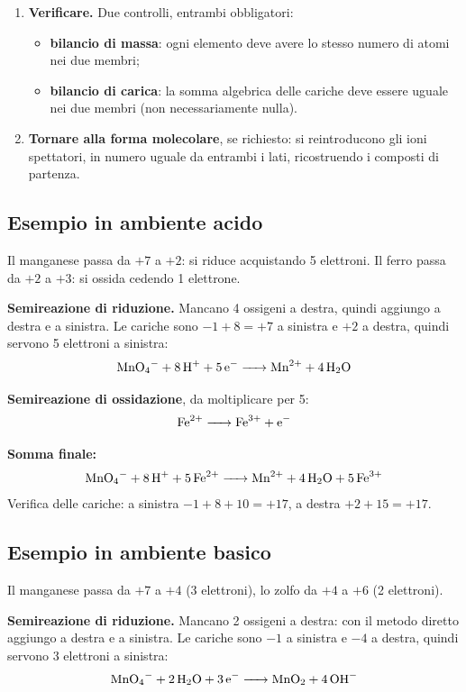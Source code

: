 \documentclass[11pt, a4paper, openright]{book}
\begin{document}
\begin{enumerate}
    \item \textbf{Verificare.} Due controlli, entrambi obbligatori:
    \begin{itemize}
        \item \textbf{bilancio di massa}: ogni elemento deve avere lo stesso numero di atomi nei due membri;
        \item \textbf{bilancio di carica}: la somma algebrica delle cariche deve essere uguale nei due membri (non necessariamente nulla).
    \end{itemize}

    \item \textbf{Tornare alla forma molecolare}, se richiesto: si reintroducono gli ioni spettatori, in numero uguale da entrambi i lati, ricostruendo i composti di partenza.
\end{enumerate}

\subsection{Esempio in ambiente acido}
\begin{center}
\end{center}
Il manganese passa da $+7$ a $+2$: si riduce acquistando 5 elettroni. Il ferro passa da $+2$ a $+3$: si ossida cedendo 1 elettrone.

\textbf{Semireazione di riduzione.} Mancano 4 ossigeni a destra, quindi aggiungo  a destra e  a sinistra. Le cariche sono $-1+8 = +7$ a sinistra e $+2$ a destra, quindi servono 5 elettroni a sinistra:
\[
\ce{MnO4^- + 8H^+ + 5e^- -> Mn^2+ + 4H2O}
\]

\textbf{Semireazione di ossidazione}, da moltiplicare per 5:
\[
\ce{Fe^2+ -> Fe^3+ + e^-}
\]

\textbf{Somma finale:}
\[
\mathbf{\ce{MnO4^- + 8H^+ + 5Fe^2+ -> Mn^2+ + 4H2O + 5Fe^3+}}
\]
Verifica delle cariche: a sinistra $-1 + 8 + 10 = +17$, a destra $+2 + 15 = +17$.

\subsection{Esempio in ambiente basico}
\begin{center}
\end{center}
Il manganese passa da $+7$ a $+4$ (3 elettroni), lo zolfo da $+4$ a $+6$ (2 elettroni).

\textbf{Semireazione di riduzione.} Mancano 2 ossigeni a destra: con il metodo diretto aggiungo  a destra e  a sinistra. Le cariche sono $-1$ a sinistra e $-4$ a destra, quindi servono 3 elettroni a sinistra:
\[
\ce{MnO4^- + 2H2O + 3e^- -> MnO2 + 4OH^-}
\]
\end{document}
